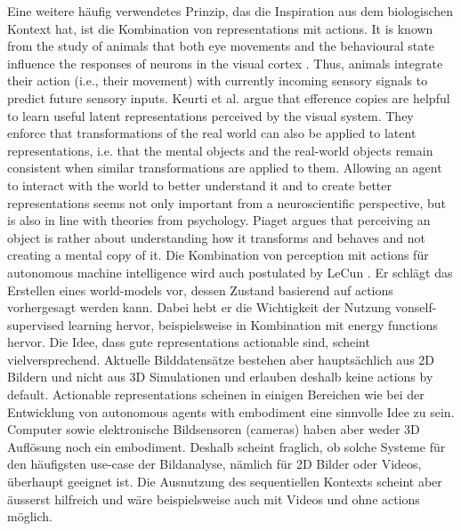 Eine weitere häufig verwendetes Prinzip, das die Inspiration aus dem biologischen Kontext hat, ist die Kombination von representations mit actions. It is known from the study of animals that both eye movements and the behavioural state influence the responses of neurons in the visual cortex .
Thus, animals integrate their action (i.e., their movement) with currently incoming sensory signals to predict future sensory inputs.
Keurti et al.  argue that efference copies are helpful to learn useful latent representations perceived by the visual system.
They enforce that transformations of the real world can also be applied to latent representations, i.e. that the mental objects and the real-world objects remain consistent when similar transformations are applied to them.
Allowing an agent to interact with the world to better understand it and to create better representations seems not only important from a neuroscientific perspective, but is also in line with theories from psychology.
Piaget  argues that perceiving an object is rather about understanding how it transforms and behaves and not creating a mental copy of it.
Die Kombination von perception mit actions für autonomous machine intelligence wird auch postulated by LeCun . Er schlägt das Erstellen eines world-models vor, dessen Zustand basierend auf actions vorhergesagt werden kann. Dabei hebt er die Wichtigkeit der Nutzung vonself-supervised learning hervor, beispielsweise in Kombination mit energy functions hervor.
Die Idee, dass gute representations actionable sind, scheint vielversprechend. Aktuelle Bilddatensätze bestehen aber hauptsächlich aus 2D Bildern und nicht aus 3D Simulationen und erlauben deshalb keine actions by default. Actionable representations scheinen in einigen Bereichen wie bei der Entwicklung von autonomous agents with embodiment eine sinnvolle Idee zu sein. Computer sowie elektronische Bildsensoren (cameras) haben aber weder 3D Auflösung noch ein embodiment. Deshalb scheint fraglich, ob solche Systeme für den häufigsten use-case der Bildanalyse, nämlich für 2D Bilder oder Videos, überhaupt geeignet ist. Die Ausnutzung des sequentiellen Kontexts scheint aber äusserst hilfreich und wäre beispielsweise auch mit Videos und ohne actions möglich.


